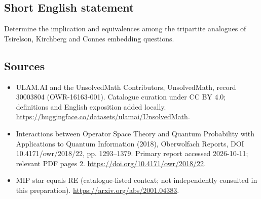 \documentclass[11pt]{article}
\begin{document}
\subsection{Short English statement}
Determine the implication and equivalences among the tripartite analogues of Tsirelson, Kirchberg and Connes embedding questions.
\subsection{Sources}
\begin{itemize}
\item[\hypertarget{source:30003804:1}{S1}] ULAM.AI and the UnsolvedMath Contributors, UnsolvedMath, record 30003804 (OWR-16163-001). Catalogue curation under CC BY 4.0; definitions and English exposition added locally.
\url{https://huggingface.co/datasets/ulamai/UnsolvedMath}.
\item[\hypertarget{source:30003804:2}{S2}] Interactions between Operator Space Theory and Quantum Probability with Applications to Quantum Information (2018), Oberwolfach Reports, DOI 10.4171/owr/2018/22, pp. 1293--1379. Primary report accessed 2026-10-11; relevant PDF pages 2.
\url{https://doi.org/10.4171/owr/2018/22}.
\item[\hypertarget{source:30003804:3}{S3}] MIP star equals RE (catalogue-listed context; not independently consulted in this preparation).
\url{https://arxiv.org/abs/2001.04383}.
\end{itemize}
\label{end:30003804}
\end{document}
